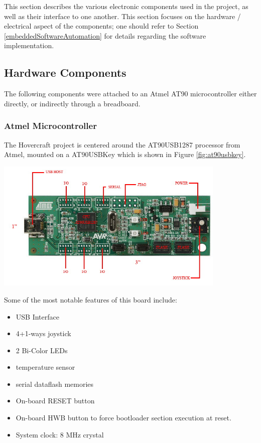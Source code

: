 This section describes the various electronic components used in the project, as well as their interface to one another.  This section focuses on the hardware / electrical aspect of the components; one should refer to Section \ref{embeddedSoftwareAutomation} for details regarding the software implementation.  

\subsection{Hardware Components}
The following components were attached to an Atmel AT90 microcontroller either directly, or indirectly through a breadboard.  

\subsubsection{Atmel Microcontroller}
The Hovercraft project is centered around the AT90USB1287 processor from Atmel, mounted on a AT90USBKey which is shown in Figure \ref{fig:at90usbkey}.

\begin{minipage}{6.5in}
  \centering
    \includegraphics[width=110mm]{imageSources/at90usbkey.png}
 
  \label{fig:at90usbkey}
\end{minipage}

Some of the most notable features of this board include:
\begin{itemize}
\item USB Interface
\item 4+1-ways joystick
\item 2 Bi-Color LEDs
\item temperature sensor
\item serial dataflash memories
\item On-board RESET button 
\item On-board HWB button to force bootloader section execution at reset.
\item System clock: 8 MHz crystal
\end{itemize}

